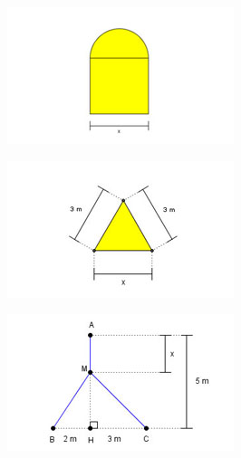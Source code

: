 \begin{figure}
    \begin{subfigure}{0.3\textwidth}
    \centering
    \includegraphics[width=.9\textwidth]{icones-modulos/pot-m-pjn.jpg}
    \end{subfigure}
    \hfill
    \begin{subfigure}{0.3\textwidth}
    \centering
    \includegraphics[width=.9\textwidth]{icones-modulos/pot-m-ptr.jpg}
    \end{subfigure}
    \hfill
    \begin{subfigure}{0.3\textwidth}
    \centering
    \includegraphics[width=.9\textwidth]{icones-modulos/pot-m-pge.jpg}
    \label{fig:pge-ic}
    \end{subfigure}
    

\end{figure}
